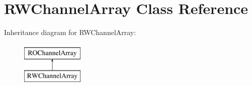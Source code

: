 \hypertarget{classRWChannelArray}{}\section{R\+W\+Channel\+Array Class Reference}
\label{classRWChannelArray}
Inheritance diagram for R\+W\+Channel\+Array\+:\begin{figure}[H]
\begin{center}
\leavevmode
\includegraphics[height=2.000000cm]{classRWChannelArray}
\end{center}
\end{figure}
